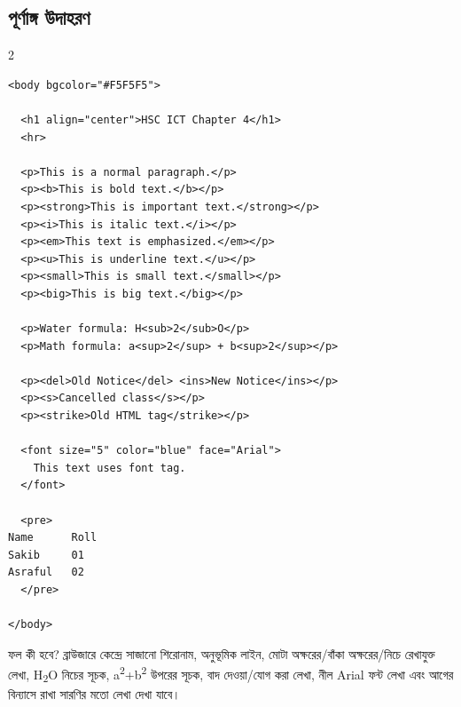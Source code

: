 

\subsection{পূর্ণাঙ্গ উদাহরণ}

\par{}\par
\begin{multicols}{2}
\begin{verbatim}
<body bgcolor="#F5F5F5">

  <h1 align="center">HSC ICT Chapter 4</h1>
  <hr>

  <p>This is a normal paragraph.</p>
  <p><b>This is bold text.</b></p>
  <p><strong>This is important text.</strong></p>
  <p><i>This is italic text.</i></p>
  <p><em>This text is emphasized.</em></p>
  <p><u>This is underline text.</u></p>
  <p><small>This is small text.</small></p>
  <p><big>This is big text.</big></p>

  <p>Water formula: H<sub>2</sub>O</p>
  <p>Math formula: a<sup>2</sup> + b<sup>2</sup></p>

  <p><del>Old Notice</del> <ins>New Notice</ins></p>
  <p><s>Cancelled class</s></p>
  <p><strike>Old HTML tag</strike></p>

  <font size="5" color="blue" face="Arial">
    This text uses font tag.
  </font>

  <pre>
Name      Roll
Sakib     01
Asraful   02
  </pre>

</body>
\end{verbatim}
\end{multicols}


\begin{examplebox}{ফল কী হবে?}
ব্রাউজারে কেন্দ্রে সাজানো শিরোনাম, অনুভূমিক লাইন, মোটা অক্ষরের/বাঁকা অক্ষরের/নিচে রেখাযুক্ত লেখা, H\textsubscript{2}O নিচের সূচক, a\textsuperscript{2}+b\textsuperscript{2} উপরের সূচক, বাদ দেওয়া/যোগ করা লেখা, নীল Arial ফন্ট লেখা এবং আগের বিন্যাসে রাখা সারণির মতো লেখা দেখা যাবে।
\end{examplebox}

